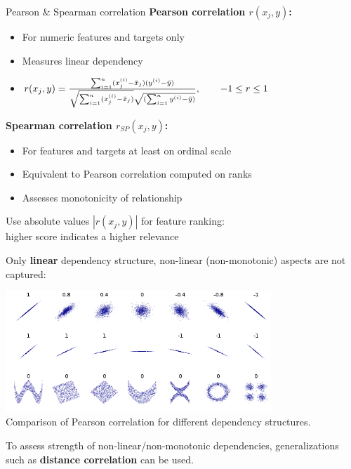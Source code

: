 \documentclass[11pt,compress,t,notes=noshow, xcolor=table]{beamer}
\begin{document}
  \begin{vbframe}{Pearson \& Spearman correlation}
  \textbf{Pearson correlation $r(x_j, y)$: }
  \begin{itemize}
    \item For numeric features and targets only
    \item Measures linear dependency
    \item $ r(x_j, y) = \frac{\sum_{i=1}^n (x^{(i)}_j - \bar{x}_j) (y^{(i)} - \bar{y})}{\sqrt{\sum_{i=1}^n (x^{(i)}_j - \bar{x}_j)} \sqrt{(\sum_{i=1}^n y^{(i)} - \bar{y})}},\qquad -1 \le r \le 1$
  \end{itemize}
  \vspace{0.4cm}
  \textbf{Spearman correlation $r_{SP}(x_j, y)$:}
  \begin{itemize}
    \item For features and targets at least on ordinal scale
    \item Equivalent to Pearson correlation computed on ranks
    \item Assesses monotonicity of relationship
  \end{itemize}
  \lz
  Use absolute values $|r(x_j, y)|$ for feature ranking:\\
  higher score indicates a higher relevance

  \framebreak

  Only \textbf{linear} dependency structure, non-linear (non-monotonic) aspects are not captured:

  \lz

  \begin{center}
\includegraphics[width=0.75\textwidth]{figure_man/correlation_example.png}\\
\footnotesize{Comparison of Pearson correlation for different dependency structures.}
  \end{center}
  \vspace{0.1cm}
  To assess strength of non-linear/non-monotonic dependencies, generalizations such as \textbf{distance correlation} can be used.


\end{vbframe}
\end{document}
